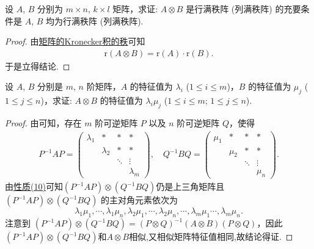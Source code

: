 \documentclass[../../main.tex]{subfiles}%
\begin{document}
\begin{corollary}\label{corollary:矩阵的Kronecker积关于行列满秩阵的推论}
设 $A$, $B$ 分别为 $m\times n$, $k\times l$ 矩阵，求证: $A\otimes B$ 是行满秩阵 (列满秩阵) 的充要条件是 $A$, $B$ 均为行满秩阵 (列满秩阵). 
\end{corollary}
\begin{proof}
由\hyperref[proposition:矩阵的Kronecker积的秩]{矩阵的Kronecker积的秩}可知
\begin{align*}
\mathrm{r}\left( A\otimes B \right) =\mathrm{r}\left( A \right) \cdot \mathrm{r}\left( B \right) .
\end{align*}
于是立得结论.
\end{proof}

\begin{proposition}[矩阵的Kronecker积的特征值]\label{proposition:矩阵的Kronecker积的特征值}
设 $A$, $B$ 分别是 $m$, $n$ 阶矩阵，$A$ 的特征值为 $\lambda_i$ ($1\leqslant  i\leqslant  m$)，$B$ 的特征值为 $\mu_j$ ($1\leqslant  j\leqslant  n$)，求证: $A\otimes B$ 的特征值为 $\lambda_i\mu_j$ ($1\leqslant  i\leqslant  m$; $1\leqslant  j\leqslant  n$).
\end{proposition}
\begin{proof}
由可知，存在 $m$ 阶可逆矩阵 $P$ 以及 $n$ 阶可逆矩阵 $Q$，使得
\begin{align*}
P^{-1}AP = 
\begin{pmatrix}
\lambda_1 & * & * & * \\
& \lambda_2 & * & * \\
& & \ddots & \vdots \\
& & & \lambda_m
\end{pmatrix}, \quad 
Q^{-1}BQ = 
\begin{pmatrix}
\mu_1 & * & * & * \\
& \mu_2 & * & * \\
& & \ddots & \vdots \\
& & & \mu_n
\end{pmatrix}.
\end{align*}
由\hyperref[矩阵的Kronecker积的基本性质(10)]{性质(10)}可知$(P^{-1}AP)\otimes (Q^{-1}BQ)$仍是上三角矩阵且 $(P^{-1}AP)\otimes (Q^{-1}BQ)$ 的主对角元素依次为
\[
\lambda_1\mu_1,\cdots,\lambda_1\mu_n,\lambda_2\mu_1,\cdots,\lambda_2\mu_n,\cdots,\lambda_m\mu_1\cdots,\lambda_m\mu_n.
\]
注意到 $(P^{-1}AP)\otimes (Q^{-1}BQ)=(P\otimes Q)^{-1}(A\otimes B)(P\otimes Q)$，因此$(P^{-1}AP)\otimes (Q^{-1}BQ)$和$A\otimes B$相似,又相似矩阵特征值相同,故结论得证.
\end{proof}
\end{document}
